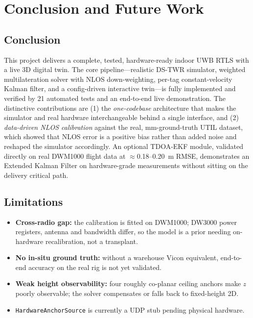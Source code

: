 \documentclass[a4paper,12pt,onecolumn]{report}
\begin{document}
\chapter{Conclusion and Future Work}

\section{Conclusion}
This project delivers a complete, tested, hardware-ready indoor UWB RTLS with a
live 3D digital twin. The core pipeline---realistic DS-TWR simulator, weighted
multilateration solver with NLOS down-weighting, per-tag constant-velocity Kalman
filter, and a config-driven interactive twin---is fully implemented and
verified by 21 automated tests and an end-to-end live demonstration. The
distinctive contributions are (1) the \emph{one-codebase} architecture that makes
the simulator and real hardware interchangeable behind a single interface, and
(2) \emph{data-driven NLOS calibration} against the real, mm-ground-truth UTIL
dataset, which showed that NLOS error is a positive bias rather than added noise
and reshaped the simulator accordingly. An optional TDOA-EKF module, validated
directly on real DWM1000 flight data at $\approx$0.18--0.20~m RMSE, demonstrates
an Extended Kalman Filter on hardware-grade measurements without sitting on the
delivery critical path.

\section{Limitations}
\begin{itemize}[nosep]
  \item \textbf{Cross-radio gap:} the calibration is fitted on DWM1000; DW3000
        power registers, antenna and bandwidth differ, so the model is a prior
        needing on-hardware recalibration, not a transplant.
  \item \textbf{No in-situ ground truth:} without a warehouse Vicon equivalent,
        end-to-end accuracy on the real rig is not yet validated.
  \item \textbf{Weak height observability:} four roughly co-planar ceiling
        anchors make $z$ poorly observable; the solver compensates or falls back
        to fixed-height 2D.
  \item \texttt{HardwareAnchorSource} is currently a UDP stub pending physical
        hardware.
\end{itemize}
\end{document}
